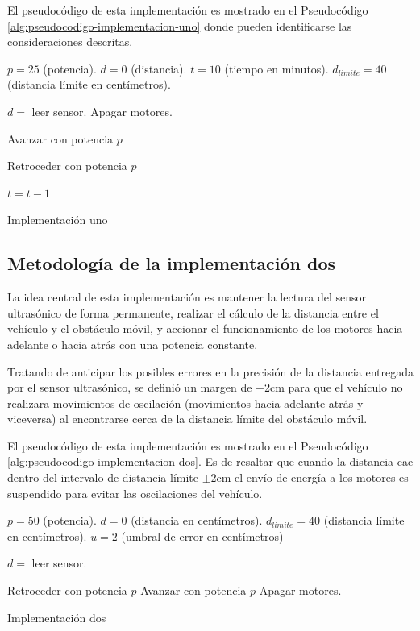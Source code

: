 \documentclass[journal]{IEEEtran}
\begin{document}
El pseudocódigo de esta implementación es mostrado en el Pseudocódigo \ref{alg:pseudocodigo-implementacion-uno} donde pueden identificarse las consideraciones descritas.

\begin{algorithm}
\begin{algorithmic}[1]
\STATE $p = 25$ (potencia).
\STATE $d = 0$ (distancia).
\STATE $t = 10$ (tiempo en minutos).
\STATE $d_{limite} = 40$ (distancia límite en centímetros).

	\STATE $d=$ leer sensor.
		\STATE Apagar motores.
	\ENDIF

		\STATE Avanzar con potencia $p$
	\ENDIF

		\STATE Retroceder con potencia $p$
	\ENDIF

	\STATE $t=t-1$
\ENDWHILE
\end{algorithmic}
\caption{Implementación uno}\label{alg:pseudocodigo-implementacion-uno}
\end{algorithm}

\subsection{Metodología de la implementación dos}
\label{sub:metodologia-implementacion-dos}
La idea central de esta implementación es mantener la lectura del sensor ultrasónico de forma permanente, realizar el cálculo de la distancia entre el vehículo y el obstáculo móvil, y accionar el funcionamiento de los motores hacia adelante o hacia atrás con una potencia constante.

Tratando de anticipar los posibles errores en la precisión de la distancia entregada por el sensor ultrasónico, se definió un margen de $\pm$2cm para que el vehículo no realizara movimientos de oscilación (movimientos hacia adelante-atrás y viceversa) al encontrarse cerca de la distancia límite del obstáculo móvil.

El pseudocódigo de esta implementación es mostrado en el Pseudocódigo \ref{alg:pseudocodigo-implementacion-dos}.
Es de resaltar que cuando la distancia cae dentro del intervalo de distancia límite $\pm$2cm el envío de energía a los motores es suspendido para evitar las oscilaciones del vehículo.

\begin{algorithm}
\begin{algorithmic}[1]
\STATE $p = 50$ (potencia).
\STATE $d = 0$ (distancia en centímetros).
\STATE $d_{limite} = 40$ (distancia límite en centímetros).
\STATE $u = 2$ (umbral de error en centímetros)

\WHILE {\TRUE}
	\STATE $d=$ leer sensor.
	
		\STATE Retroceder con potencia $p$
		\STATE Avanzar con potencia $p$
	\ELSE
		\STATE Apagar motores.
	\ENDIF

\ENDWHILE
\end{algorithmic}
\caption{Implementación dos}\label{alg:pseudocodigo-implementacion-dos}
\end{algorithm}
\end{document}
